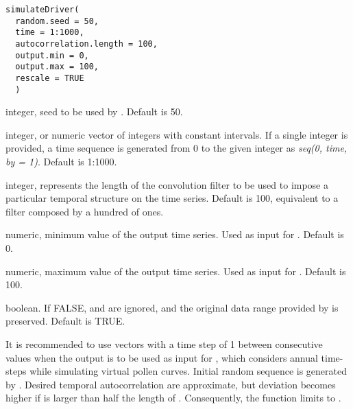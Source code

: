 \documentclass[letterpaper]{book}
\begin{document}
%
\begin{Usage}
\begin{verbatim}
simulateDriver(
  random.seed = 50,
  time = 1:1000,
  autocorrelation.length = 100,
  output.min = 0,
  output.max = 100,
  rescale = TRUE
  )
\end{verbatim}
\end{Usage}
%
\begin{Arguments}
\begin{ldescription}
\item[\code{random.seed}] integer, seed to be used by . Default is 50.

\item[\code{time}] integer, or numeric vector of integers with constant intervals. If a single integer is provided, a time sequence is generated from 0 to the given integer as \emph{seq(0, time, by = 1)}. Default is 1:1000.

\item[\code{autocorrelation.length}] integer, represents the length of the convolution filter to be used to impose a particular temporal structure on the time series. Default is 100, equivalent to a filter composed by a hundred of ones.

\item[\code{output.min}] numeric, minimum value of the output time series. Used as input for . Default is 0.

\item[\code{output.max}] numeric, maximum value of the output time series. Used as input for . Default is 100.

\item[\code{rescale}] boolean. If FALSE,  and  are ignored, and the original data range provided by  is preserved. Default is TRUE.
\end{ldescription}
\end{Arguments}
%
\begin{Details}\relax
It is recommended to use  vectors with a time step of 1 between consecutive values when the output is to be used as input for , which considers annual time-steps while simulating virtual pollen curves. Initial random sequence is generated by . Desired temporal autocorrelation are approximate, but deviation becomes higher if  is larger than half the length of . Consequently, the function limits  to .
\end{Details}
\end{document}
